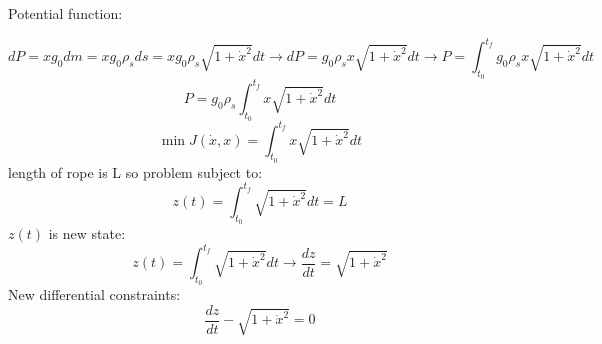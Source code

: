 Potential function:


$$dP = xg_0dm = xg_0\rho_s ds = xg_0\rho_s\sqrt{1+\dot{x}^2}dt
\to dP = g_0\rho_sx\sqrt{1+\dot{x}^2} dt\to P = \int_{t_0}^{t_f} g_0\rho_sx\sqrt{1+\dot{x}^2}dt
$$
$$P = g_0\rho_s\int_{t_0}^{t_f} x\sqrt{1+\dot{x}^2}dt$$
$$\min J(\dot{x}, x) = \int_{t_0}^{t_f} x\sqrt{1+\dot{x}^2}dt$$
length of rope is L so problem subject to:
$$z(t) = \int_{t_0}^{t_f} \sqrt{1+\dot{x}^2}dt = L$$ 
$z(t)$ is new state:
$$z(t) = \int_{t_0}^{t_f} \sqrt{1+\dot{x}^2}dt\to \dfrac{dz}{dt} =\sqrt{1+\dot{x}^2} $$
New differential constraints:
$$\dfrac{dz}{dt} - \sqrt{1+\dot{x}^2}  = 0$$
